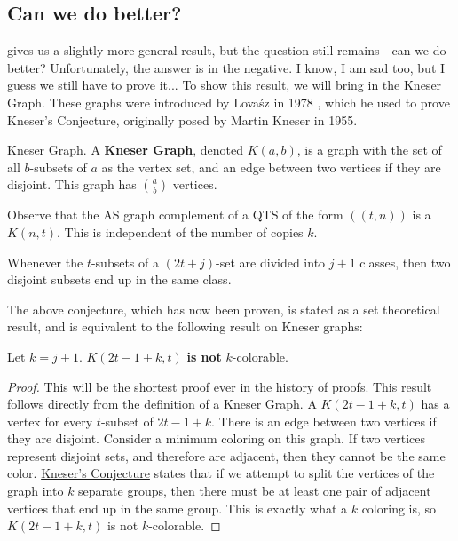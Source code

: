 \subsection{Can we do better?}
\label{ssec:better}

 gives us a slightly more general result, but the question still remains - can we do better? Unfortunately, the answer is in the negative. I know, I am sad too, but I guess we still have to prove it... To show this result, we will bring in the Kneser Graph. These graphs were introduced by Lova\'{s}z in 1978 \cite{lovasz_knesers_1978}, which he used to prove Kneser's Conjecture, originally posed by Martin Kneser in 1955.

\begin{definition}{Kneser Graph.}
    \label{defn:kneser-graph}
    A \textbf{Kneser Graph}, denoted $K(a,b)$, is a graph with the set of all $b$-subsets of $a$ as the vertex set, and an edge between two vertices if they are disjoint. This graph has $\binom{a}{b}$ vertices.  
\end{definition}

\begin{remark}
    Observe that the AS graph complement of a QTS of the form $((t,n))$ is a $K(n,t)$. This is independent of the number of copies $k$.
\end{remark}

\begin{kneserconjecture}
    \label{thm:kneser-conjecture}
    Whenever the $t$-subsets of a $(2t+j)$-set are divided into $j+1$ classes, then two disjoint subsets end up in the same class. 
\end{kneserconjecture}

The above conjecture, which has now been proven, is stated as a set theoretical result, and is equivalent to the following result on Kneser graphs:

\begin{corollary}
    \label{cor:no}
    Let $k=j+1$. $K(2t-1+k,t)$ \textbf{is not} $k$-colorable.
\end{corollary}

\begin{proof}
    This will be the shortest proof ever in the history of proofs. This result follows directly from the definition of a Kneser Graph. A $K(2t-1+k,t)$ has a vertex for every $t$-subset of $2t-1+k$. There is an edge between two vertices if they are disjoint. Consider a minimum coloring on this graph. If two vertices represent disjoint sets, and therefore are adjacent, then they cannot be the same color. \hyperref[thm:kneser-conjecture]{Kneser's Conjecture}  states that if we attempt to split the vertices of the graph into $k$ separate groups, then there must be at least one pair of adjacent vertices that end up in the same group. This is exactly what a $k$ coloring is, so $K(2t-1+k,t)$ is not $k$-colorable.
\end{proof}

